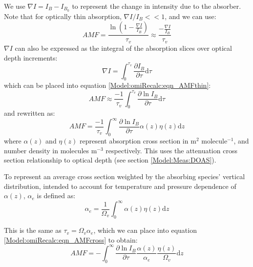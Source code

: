     We use $\nabla I = I_B - I_{B_0}$ to represent the change in intensity due to the absorber. Note that for optically thin absorption, $\nabla I / I_B << 1$, and we can use:
    \begin{equation} \label{Model:omiRecalc:eqn_AMFthin}
    AMF = \frac{\ln{ \left( 1 - \frac{\nabla I}{I_B} \right)} }{\tau_v} \approx \frac{ - \frac{\nabla I}{I_B} }{\tau_v}
    \end{equation}
    $\nabla I$ can also be expressed as the integral of the absorption slices over optical depth increments: 
    \begin{equation*}
      \nabla I = \int_0^{\tau_v}{\frac{\partial I_B}{\partial \tau} \mathrm{d}\tau}
    \end{equation*}
    which can be placed into equation \ref{Model:omiRecalc:eqn_AMFthin}:
    \begin{equation*}
      AMF \approx \frac{-1}{\tau_v} \int_0^{\tau_v}{\frac{\partial \ln{I_B}}{\partial \tau} \mathrm{d}\tau}
    \end{equation*}
    and rewritten as:
    \begin{equation} \label{Model:omiRecalc:eqn_AMFcross}
    AMF = \frac{-1}{\tau_v} \int_0^\infty {\frac{\partial \ln{I_B}}{\partial \tau} \alpha(z)\eta(z)\mathrm{d}z}
    \end{equation}
    where $\alpha(z)$ and $\eta(z)$ represent absorption cross section in m$^2$ molecule$^{-1}$, and number density in molecules m$^{-3}$ respectively. 
    This uses the attenuation cross section relationship to optical depth (see section \ref{Model:Meas:DOAS}).
    
    To represent an average cross section weighted by the absorbing species' vertical distribution, intended to account for temperature and pressure dependence of $\alpha(z)$, $\alpha_e$ is defined as:
    \begin{equation*}
      \alpha_e = \frac{1}{\Omega_v} \int_0^\infty \alpha(z) \eta(z) \mathrm{d}z
    \end{equation*}
    
    This is the same as $ \tau_v = \Omega_v \alpha_e $, which we can place into equation \ref{Model:omiRecalc:eqn_AMFcross} to obtain:
    \begin{equation} \label{Model:omiRecalc:eqn_AMFpreomega}
      AMF=-\int_0^\infty{ \frac{\partial \ln{I_B}}{\partial \tau} \frac{\alpha(z)}{\alpha_e} \frac{\eta(z)}{\Omega_v} \mathrm{d}z }
    \end{equation}
    
